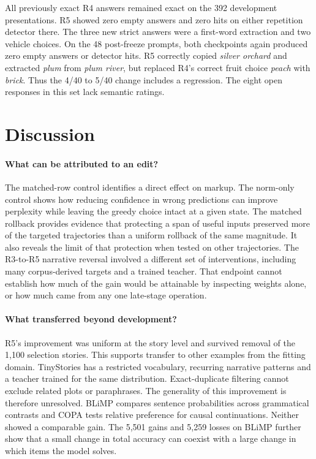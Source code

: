 \documentclass[11pt]{article}
\begin{document}
All previously exact R4 answers remained exact on the 392 development presentations. R5 showed zero empty answers and zero hits on either repetition detector there. The three new strict answers were a first-word extraction and two vehicle choices. On the 48 post-freeze prompts, both checkpoints again produced zero empty answers or detector hits. R5 correctly copied \emph{silver orchard} and extracted \emph{plum} from \emph{plum river}, but replaced R4's correct fruit choice \emph{peach} with \emph{brick}. Thus the 4/40 to 5/40 change includes a regression. The eight open responses in this set lack semantic ratings.

\section{Discussion}
\paragraph{What can be attributed to an edit?}
The matched-row control identifies a direct effect on markup. The norm-only control shows how reducing confidence in wrong predictions can improve perplexity while leaving the greedy choice intact at a given state. The matched rollback provides evidence that protecting a span of useful inputs preserved more of the targeted trajectories than a uniform rollback of the same magnitude. It also reveals the limit of that protection when tested on other trajectories. The R3-to-R5 narrative reversal involved a different set of interventions, including many corpus-derived targets and a trained teacher. That endpoint cannot establish how much of the gain would be attainable by inspecting weights alone, or how much came from any one late-stage operation.

\paragraph{What transferred beyond development?}
R5's improvement was uniform at the story level and survived removal of the 1,100 selection stories. This supports transfer to other examples from the fitting domain. TinyStories has a restricted vocabulary, recurring narrative patterns and a teacher trained for the same distribution. Exact-duplicate filtering cannot exclude related plots or paraphrases. The generality of this improvement is therefore unresolved. BLiMP compares sentence probabilities across grammatical contrasts and COPA tests relative preference for causal continuations. Neither showed a comparable gain. The 5,501 gains and 5,259 losses on BLiMP further show that a small change in total accuracy can coexist with a large change in which items the model solves.
\end{document}
